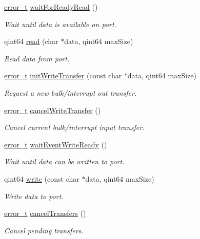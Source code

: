 \begin{DoxyCompactItemize}
\hyperlink{classmdt_abstract_port_ad4121bb930c95887e77f8bafa065a85e}{error\_\-t} \hyperlink{classmdt_usb_port_ab8ddd4ebee603ac381e8da0383a61e36}{waitForReadyRead} ()
\begin{DoxyCompactList}\small\item\em Wait until data is available on port. \end{DoxyCompactList}\item 
qint64 \hyperlink{classmdt_usb_port_abce257345c8af47494215cd7ee75f82d}{read} (char $\ast$data, qint64 maxSize)
\begin{DoxyCompactList}\small\item\em Read data from port. \end{DoxyCompactList}\item 
\hyperlink{classmdt_abstract_port_ad4121bb930c95887e77f8bafa065a85e}{error\_\-t} \hyperlink{classmdt_usb_port_a3340dc3f53e857e39053988e4925fc97}{initWriteTransfer} (const char $\ast$data, qint64 maxSize)
\begin{DoxyCompactList}\small\item\em Request a new bulk/interrupt out transfer. \end{DoxyCompactList}\item 
\hyperlink{classmdt_abstract_port_ad4121bb930c95887e77f8bafa065a85e}{error\_\-t} \hyperlink{classmdt_usb_port_a7cbe1cd3649861aac5e6a14830f06cf9}{cancelWriteTransfer} ()
\begin{DoxyCompactList}\small\item\em Cancel current bulk/interrupt input transfer. \end{DoxyCompactList}\item 
\hyperlink{classmdt_abstract_port_ad4121bb930c95887e77f8bafa065a85e}{error\_\-t} \hyperlink{classmdt_usb_port_a3be875f6f10ae94fd3a94f925bb935e7}{waitEventWriteReady} ()
\begin{DoxyCompactList}\small\item\em Wait until data can be written to port. \end{DoxyCompactList}\item 
qint64 \hyperlink{classmdt_usb_port_af81c0fc2955ed2778ccdf6c7206f2b16}{write} (const char $\ast$data, qint64 maxSize)
\begin{DoxyCompactList}\small\item\em Write data to port. \end{DoxyCompactList}\item 
\hyperlink{classmdt_abstract_port_ad4121bb930c95887e77f8bafa065a85e}{error\_\-t} \hyperlink{classmdt_usb_port_afe5b473e1df8b828c17f83a45a3902fb}{cancelTransfers} ()
\begin{DoxyCompactList}\small\item\em Cancel pending transfers. \end{DoxyCompactList}\end{DoxyCompactItemize}
